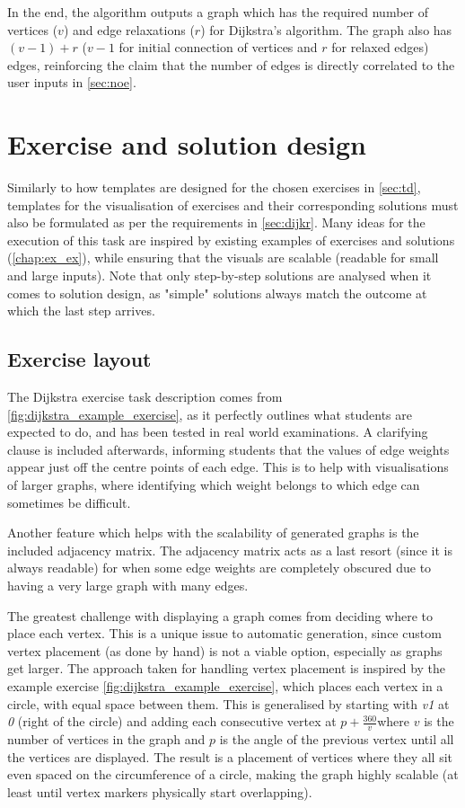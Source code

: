 \documentclass{l4proj}
\begin{document}
In the end, the algorithm outputs a graph which has the required number of vertices ($v$) and edge relaxations ($r$) for Dijkstra's algorithm. The graph also has $(v-1) + r$ ($v-1$ for initial connection of vertices and $r$ for relaxed edges) edges, reinforcing the claim that the number of edges is directly correlated to the user inputs in \autoref{sec:noe}.

\section{Exercise and solution design}


Similarly to how templates are designed for the chosen exercises in \autoref{sec:td}, templates for the visualisation of exercises and their corresponding solutions must also be formulated as per the requirements in \autoref{sec:dijkr}. Many ideas for the execution of this task are inspired by existing examples of exercises and solutions (\autoref{chap:ex_ex}), while ensuring that the visuals are scalable (readable for small and large inputs). Note that only step-by-step solutions are analysed when it comes to solution design, as "simple" solutions always match the outcome at which the last step arrives.

\subsection{Exercise layout}
\label{sec:dijkstraExerciseDesign}

The Dijkstra exercise task description comes from \autoref{fig:dijkstra_example_exercise}, as it perfectly outlines what students are expected to do, and has been tested in real world examinations. A clarifying clause is included afterwards, informing students that the values of edge weights appear just off the centre points of each edge. This is to help with visualisations of larger graphs, where identifying which weight belongs to which edge can sometimes be difficult.

Another feature which helps with the scalability of generated graphs is the included adjacency matrix. The adjacency matrix acts as a last resort (since it is always readable) for when some edge weights are completely obscured due to having a very large graph with many edges. 

The greatest challenge with displaying a graph comes from deciding where to place each vertex. This is a unique issue to automatic generation, since custom vertex placement (as done by hand) is not a viable option, especially as graphs get larger. The approach taken for handling vertex placement is inspired by the example exercise  \autoref{fig:dijkstra_example_exercise}, which places each vertex in a circle, with equal space between them. This is generalised by starting with \emph{v1} at \emph{0 \textdegree} (right of the circle) and adding each consecutive vertex at $p+\frac{360 }{v}$\textdegree where $v$ is the number of vertices in the graph and $p$ is the angle of the previous vertex until all the vertices are displayed. The result is a placement of vertices where they all sit even spaced on the circumference of a circle, making the graph highly scalable (at least until vertex markers physically start overlapping).
\end{document}
